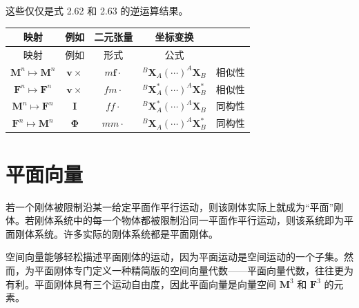 \documentclass[10pt,a4paper]{book}
\theoremstyle{thmstyle} %
\theoremstyle{defstyle} %
\theoremstyle{prostyle} %
\begin{document}
这些仅仅是式 2.62 和 2.63 的逆运算结果。



\begin{table}[htbp]

\centering

\begin{tabular}{ccccc}

\toprule

映射 & 例如 & 二元张量 & 坐标变换 &  \\

\midrule

映射 & 例如 & 形式 & 公式 &  \\

$\mathbf{M}^{n} \mapsto \mathbf{M}^{n}$ & $\boldsymbol{v} \times$ & $m \boldsymbol{f} \cdot$ & $^{B} \mathbf{X}_{A}\left(\cdots\right)^{A} \mathbf{X}_{B}$ & 相似性 \\

$\mathbf{F}^{n} \mapsto \mathbf{F}^{n}$ & $\boldsymbol{v} \times$ & $f m \cdot$ & $^{B} \mathbf{X}_{A}^{*}\left(\cdots\right)^{A} \mathbf{X}_{B}^{*}$ & 相似性 \\

$\mathbf{M}^{n} \mapsto \mathbf{F}^{n}$ & $\boldsymbol{I}$ & $f f \cdot$ & $^{B} \mathbf{X}_{A}^{*}\left(\cdots\right)^{A} \mathbf{X}_{B}$ & 同构性 \\

$\mathbf{F}^{n} \mapsto \mathbf{M}^{n}$ & $\boldsymbol{\Phi}$ & $m m \cdot$ & $^{B} \mathbf{X}_{A}\left(\cdots\right)^{A} \mathbf{X}_{B}^{*}$ & 同构性 \\

\bottomrule

\end{tabular}

\end{table}



\section{平面向量}





若一个刚体被限制沿某一给定平面作平行运动，则该刚体实际上就成为“平面”刚体。若刚体系统中的每一个物体都被限制沿同一平面作平行运动，则该系统即为平面刚体系统。许多实际的刚体系统都是平面刚体。



空间向量能够轻松描述平面刚体的运动，因为平面运动是空间运动的一个子集。然而，为平面刚体专门定义一种精简版的空间向量代数——平面向量代数，往往更为有利。平面刚体具有三个运动自由度，因此平面向量是向量空间 $\mathbf{M}^3$ 和 $\mathbf{F}^3$ 的元素。
\end{document}

